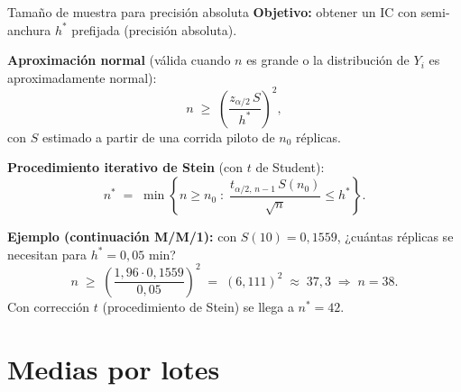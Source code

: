 \documentclass[aspectratio=1610, 10pt]{beamer}
\begin{document}
\begin{frame}{Tamaño de muestra para precisión absoluta}
\textbf{Objetivo:} obtener un IC con semi-anchura $h^*$ prefijada (precisión absoluta).

\vspace{0.2cm}
\textbf{Aproximación normal} (válida cuando $n$ es grande o la distribución de $Y_i$ es aproximadamente normal):
\[
n \;\geq\; \left(\frac{z_{\alpha/2}\, S}{h^*}\right)^2,
\]
con $S$ estimado a partir de una corrida piloto de $n_0$ réplicas.

\vspace{0.2cm}
\textbf{Procedimiento iterativo de Stein} (con $t$ de Student):
\[
n^* \;=\; \min\!\left\{n \geq n_0 \;:\; \frac{t_{\alpha/2,\,n-1}\, S(n_0)}{\sqrt{n}} \leq h^*\right\}.
\]

\vspace{0.2cm}
\begin{ejemplobox}
\textbf{Ejemplo (continuación M/M/1):} con $S(10)=0{,}1559$, ¿cuántas réplicas se necesitan para $h^*=0{,}05$ min?
\[
n \;\geq\; \left(\frac{1{,}96 \cdot 0{,}1559}{0{,}05}\right)^2 \;=\; (6{,}111)^2 \;\approx\; 37{,}3 \;\Rightarrow\; n=38.
\]
Con corrección $t$ (procedimiento de Stein) se llega a $n^* = 42$.
\end{ejemplobox}
\end{frame}

\section{Medias por lotes}
\end{document}
